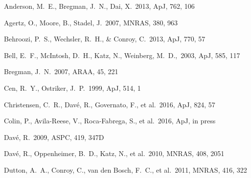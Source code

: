 \documentclass[useAMS,usenatbib]{mn2e}
\def \apj {ApJ}
\def \mnras {MNRAS}
\begin{document}

\begin{thebibliography}{}


 Anderson, M.~E., Bregman, J.~N., Dai, X.\ 2013, \apj, 762, 106

 Agertz, O., Moore, B., Stadel, J.\ 2007, \mnras, 380, 963


 Behroozi, P.~S.,
  Wechsler, R.~H., \& Conroy, C.\ 2013, \apj, 770, 57

 Bell, E.~F., McIntosh, D.~H., Katz, N., Weinberg, M.~D.,\ 2003, \apj, 585, 117

Bregman, J.~N.\ 2007, ARAA, 45, 221


Cen, R.~Y., Ostriker, J.~P.\ 1999, \apj, 514, 1

Christensen, C.~R., Dav{\'e}, R., Governato, F., et al.\ 2016, \apj, 824, 57

Colin, P., Avila-Reese, V., Roca-Fabrega, S., et al.\ 2016, \apj, in press


 Dav{\'e}, R.\ 2009, ASPC, 419, 347D

 Dav{\'e}, R., Oppenheimer, B.~D., Katz, N., et al.\ 2010, \mnras, 408, 2051

 Dutton, A.~A., Conroy, 
  C., van den Bosch, F.~C., et al.\ 2011, \mnras, 416, 322
  

\end{thebibliography}
\end{document}

